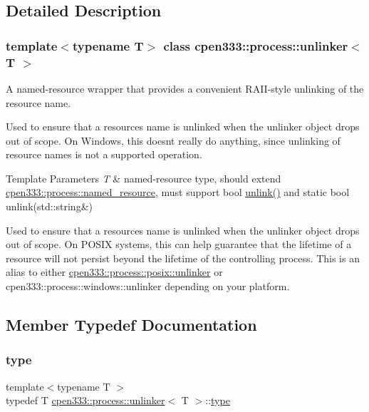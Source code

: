 \subsection{Detailed Description}
\subsubsection*{template$<$typename T$>$\newline
class cpen333\+::process\+::unlinker$<$ T $>$}

A named-\/resource wrapper that provides a convenient R\+A\+I\+I-\/style unlinking of the resource name. 

Used to ensure that a resource\textquotesingle{}s name is unlinked when the unlinker object drops out of scope. On Windows, this doesn\textquotesingle{}t really do anything, since unlinking of resource names is not a supported operation.


\begin{DoxyTemplParams}{Template Parameters}
{\em T} & named-\/resource type, should extend \hyperlink{classcpen333_1_1process_1_1named__resource}{cpen333\+::process\+::named\+\_\+resource}, must support {\ttfamily bool \hyperlink{classcpen333_1_1process_1_1unlinker_a00dd4ad138a95aa0173f81fd83c3210e}{unlink()}} and {\ttfamily static bool unlink(std\+::string\&)}\\
\hline
\end{DoxyTemplParams}
Used to ensure that a resource\textquotesingle{}s name is unlinked when the unlinker object drops out of scope. On P\+O\+S\+IX systems, this can help guarantee that the lifetime of a resource will not persist beyond the lifetime of the controlling process. This is an alias to either \hyperlink{classcpen333_1_1process_1_1posix_1_1unlinker}{cpen333\+::process\+::posix\+::unlinker} or cpen333\+::process\+::windows\+::unlinker depending on your platform. 

\subsection{Member Typedef Documentation}
\mbox{\label{classcpen333_1_1process_1_1unlinker_aca3c99d7ac2fba23d2855c88486c3f51}} 
\subsubsection{\texorpdfstring{type}{type}}
{\footnotesize\ttfamily template$<$typename T $>$ \\
typedef T \hyperlink{classcpen333_1_1process_1_1unlinker}{cpen333\+::process\+::unlinker}$<$ T $>$\+::\hyperlink{classcpen333_1_1process_1_1unlinker_aca3c99d7ac2fba23d2855c88486c3f51}{type}}

